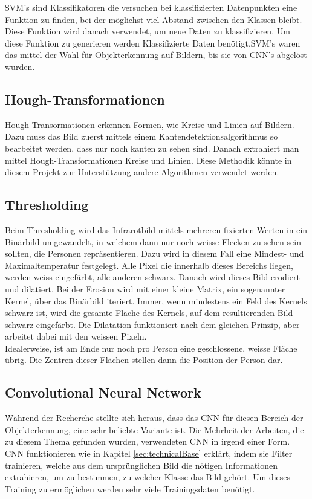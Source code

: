 \gls{SVM}'s sind Klassifikatoren die versuchen bei klassifizierten Datenpunkten eine Funktion zu finden, bei der möglichst viel Abstand zwischen den Klassen bleibt. Diese Funktion wird danach verwendet, um neue Daten zu klassifizieren. Um diese Funktion zu generieren werden Klassifizierte Daten benötigt.\gls{SVM}'s waren das mittel der Wahl für Objekterkennung auf Bildern, bis sie von \gls{CNN}'s abgelöst wurden.

\subsection{Hough-Transformationen}

Hough-Transormationen erkennen Formen, wie Kreise und Linien auf Bildern. Dazu muss das Bild zuerst mittels einem Kantendetektionsalgorithmus so bearbeitet werden, dass nur noch kanten zu sehen sind. Danach extrahiert man mittel Hough-Transformationen Kreise und Linien. Diese Methodik könnte in diesem Projekt zur Unterstützung andere Algorithmen verwendet werden.


\subsection{Thresholding}

Beim Thresholding wird das Infrarotbild mittels mehreren fixierten Werten in ein Binärbild umgewandelt, in welchem dann nur noch weisse Flecken zu sehen sein sollten, die Personen repräsentieren. Dazu wird in diesem Fall eine Mindest- und Maximaltemperatur festgelegt. Alle Pixel die innerhalb dieses Bereichs liegen, werden weiss eingefärbt, alle anderen schwarz. Danach wird dieses Bild erodiert und dilatiert. Bei der Erosion wird mit einer kleine Matrix, ein sogenannter Kernel, über das Binärbild iteriert. Immer, wenn mindestens ein Feld des Kernels schwarz ist, wird die gesamte Fläche des Kernels, auf dem resultierenden Bild schwarz eingefärbt. Die Dilatation funktioniert nach dem gleichen Prinzip, aber arbeitet dabei mit den weissen Pixeln.\\
Idealerweise, ist am Ende nur noch pro Person eine geschlossene, weisse Fläche übrig. Die Zentren dieser Flächen stellen dann die Position der Person dar.


\subsection{Convolutional Neural Network}

Während der Recherche stellte sich heraus, dass das \gls{CNN} für diesen Bereich der Objekterkennung, eine sehr beliebte Variante ist. Die Mehrheit der Arbeiten, die zu diesem Thema gefunden wurden, verwendeten \gls{CNN} in irgend einer Form.\\
\gls{CNN} funktionieren wie in Kapitel \ref{sec:technicalBase} erklärt, indem sie Filter trainieren, welche aus dem ursprünglichen Bild die nötigen Informationen extrahieren, um zu bestimmen, zu welcher Klasse das Bild gehört. Um dieses Training zu ermöglichen werden sehr viele Trainingsdaten benötigt.


